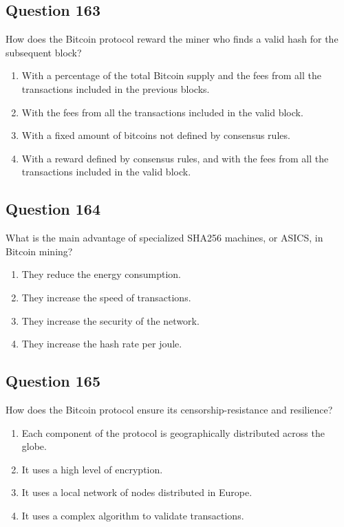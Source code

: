 \documentclass[12pt,a4paper]{article}
\begin{document}
\bigskip


\subsection*{Question 163}
How does the Bitcoin protocol reward the miner who finds a valid hash for the subsequent block?

\begin{enumerate}[label=\Alph*., leftmargin=*]
\item With a percentage of the total Bitcoin supply and the fees from all the transactions included in the previous blocks.
\item With the fees from all the transactions included in the valid block.
\item With a fixed amount of bitcoins not defined by consensus rules.
\item With a reward defined by consensus rules, and with the fees from all the transactions included in the valid block.
\end{enumerate}

\bigskip


\subsection*{Question 164}
What is the main advantage of specialized SHA256 machines, or ASICS, in Bitcoin mining?

\begin{enumerate}[label=\Alph*., leftmargin=*]
\item They reduce the energy consumption.
\item They increase the speed of transactions.
\item They increase the security of the network.
\item They increase the hash rate per joule.
\end{enumerate}

\bigskip


\subsection*{Question 165}
How does the Bitcoin protocol ensure its censorship-resistance and resilience?

\begin{enumerate}[label=\Alph*., leftmargin=*]
\item Each component of the protocol is geographically distributed across the globe.
\item It uses a high level of encryption.
\item It uses a local network of nodes distributed in Europe.
\item It uses a complex algorithm to validate transactions.
\end{enumerate}
\end{document}
